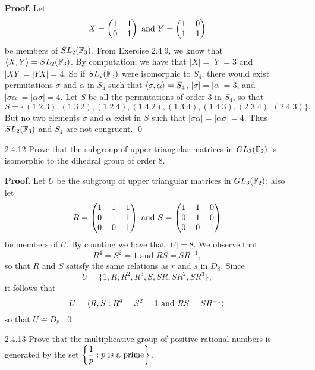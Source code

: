 \begin{enumerate}
      \textbf{Proof.} Let
      $$
         X = \left(\begin{tabular}{@{}cc@{}}
            1 & 1 \\
            0 & 1
         \end{tabular}\right) \text{ and }
         Y = \left(\begin{tabular}{@{}cc@{}}
            1 & 0 \\
            1 & 1
         \end{tabular}\right)
      $$
      be members of $SL_2(\mathbb{F}_3)$. From Exercise 2.4.9, we know that
      $\langle X, Y \rangle = SL_2(\mathbb{F}_3)$. By computation, we have that $|X| = |Y| = 3$
      and $|XY| = |YX| = 4$. So if $SL_2(\mathbb{F}_3)$ were isomorphic to $S_4$, there
      would exist permutations $\sigma$ and $\alpha$ in $S_4$ such that
      $\langle \sigma, \alpha \rangle = S_4$, $|\sigma| = |\alpha| = 3$, and
      $|\sigma\alpha| = |\alpha\sigma| = 4$. Let $S$ be all the permutations of 
      order 3 in $S_4$, so that
      $$S = \{(1\;2\;3), (1\;3\;2), (1\;2\;4), (1\;4\;2),
              (1\;3\;4), (1\;4\;3), (2\;3\;4), (2\;4\;3)\}.$$
      But no two elements $\sigma$ and $\alpha$ exist in $S$ such that
      $|\sigma\alpha| = |\alpha\sigma| = 4$. Thus $SL_2(\mathbb{F}_3)$ and $S_4$ are not
      congruent. \qed
   \item[2.4.12]  Prove that the subgroup of upper triangular matrices in
                  $GL_3(\mathbb{F}_2)$ is isomorphic to the dihedral group of order 8.

      \textbf{Proof.} Let $U$ be the subgroup of upper triangular matrices in
      $GL_3(\mathbb{F}_2)$; also let
      $$
         R = \left(\begin{tabular}{@{}ccc@{}}
            1 & 1 & 1 \\
            0 & 1 & 1 \\
            0 & 0 & 1
         \end{tabular}\right) \text{ and }
         S = \left(\begin{tabular}{@{}ccc@{}}
            1 & 1 & 0 \\
            0 & 1 & 0 \\
            0 & 0 & 1
         \end{tabular}\right)
      $$
      be members of $U$. By counting we have that $|U| = 8$. We observe that
      $$R^4 = S^2 = 1 \text{ and } RS = SR^{-1},$$
      so that $R$ and $S$ satisfy the same relations as $r$ and $s$ in $D_8$.
      Since
      $$U = \{1, R, R^2, R^3, S, SR, SR^2, SR^3\},$$
      it follows that
      $$U = \langle R, S: R^4 = S^2 = 1 \text{ and } RS = SR^{-1} \rangle$$
      so that $U \cong D_8$. \qed
   \item[2.4.13]  Prove that the multiplicative group of positive rational
                  numbers is generated by the set
                  $\left\{\displaystyle\frac{1}{p} : p \text{ is a prime}\right\}$.


\end{enumerate}
